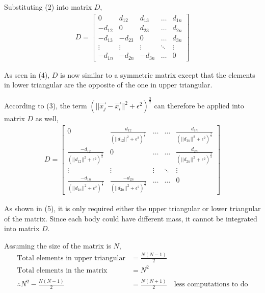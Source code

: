 \documentclass[12pt, a4paper]{article}
\begin{document}
Substituting (2) into matrix \(D\),
\begin{align}
D = \begin{bmatrix}
    0       & d_{12}  & d_{13}  & \dots  & d_{1n} \\
    -d_{12} & 0       & d_{23}  & \dots  & d_{2n} \\
    -d_{13} & -d_{23} & 0       & \dots  & d_{3n} \\
    \vdots  & \vdots  & \vdots  & \ddots & \vdots \\
    -d_{1n} & -d_{2n} & -d_{3n} & \dots  & 0
    \end{bmatrix}
\end{align}

As seen in (4), \(D\) is now similar to a symmetric matrix except that the elements in lower
triangular are the opposite of the one in upper triangular.

According to (3), the term \((||\vec{x_j} - \vec{x_i}||^2 + \epsilon^2)^\frac{3}{2}\) can therefore
be applied into matrix \(D\) as well,
\begin{align}
D = \begin{bmatrix}
    0       & \frac{d_{12}}{(||d_{12}||^2 + \epsilon^2)^\frac{3}{2}} & \dots  & \dots  & \frac{d_{1n}}{(||d_{1n}||^2 + \epsilon^2)^\frac{3}{2}} \\
    \frac{-d_{12}}{(||d_{12}||^2 + \epsilon^2)^\frac{3}{2}}          & 0      & \dots  & \dots  & \frac{d_{2n}}{(||d_{2n}||^2 + \epsilon^2)^\frac{3}{2}} \\
    \vdots  & \vdots  & \vdots & \ddots & \vdots \\
    \frac{-d_{1n}}{(||d_{1n}||^2 + \epsilon^2)^\frac{3}{2}} & \frac{-d_{2n}}{(||d_{2n}||^2 + \epsilon^2)^\frac{3}{2}} & \dots  & \dots  & 0
    \end{bmatrix}
\end{align}

As shown in (5), it is only required either the upper triangular or lower triangular of the matrix.
Since each body could have different mass, it cannot be integrated into matrix \(D\).

Assuming the size of the matrix is \(N\),
\begin{align*}
  \text{Total elements in upper triangular} &= \frac{N(N - 1)}{2} \\
  \text{Total elements in the matrix}       &= N^2 \\
  \\
  \therefore N^2 - \frac{N(N - 1)}{2} &= \frac{N(N + 1)}{2} \quad \text{less computations to do}
\end{align*}
\end{document}

